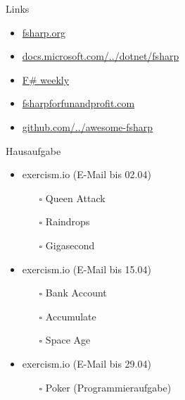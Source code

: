 \documentclass[t]{beamer}
\begin{document}
\begin{frame}[label={sec:org3a8f712}]{Links}
\begin{itemize}
\item \href{https://fsharp.org/}{fsharp.org}
\item \href{https://docs.microsoft.com/de-de/dotnet/fsharp/}{docs.microsoft.com/../dotnet/fsharp}
\item \href{https://sergeytihon.com/}{F\# weekly}
\item \href{https://fsharpforfunandprofit.com/}{fsharpforfunandprofit.com}
\item \href{https://github.com/fsprojects/awesome-fsharp}{github.com/../awesome-fsharp}
\end{itemize}
\end{frame}

\begin{frame}[label={sec:orgaf3d686}]{Hausaufgabe}
\begin{itemize}
\item exercism.io (E-Mail bis 02.04)
\begin{itemize}
\item[{$\square$}] Queen Attack
\item[{$\square$}] Raindrops
\item[{$\square$}] Gigasecond
\end{itemize}
\item exercism.io (E-Mail bis 15.04)
\begin{itemize}
\item[{$\square$}] Bank Account
\item[{$\square$}] Accumulate
\item[{$\square$}] Space Age
\end{itemize}
\item exercism.io (E-Mail bis 29.04)
\begin{itemize}
\item[{$\square$}] Poker (Programmieraufgabe)
\end{itemize}
\end{itemize}
\end{frame}
\end{document}
